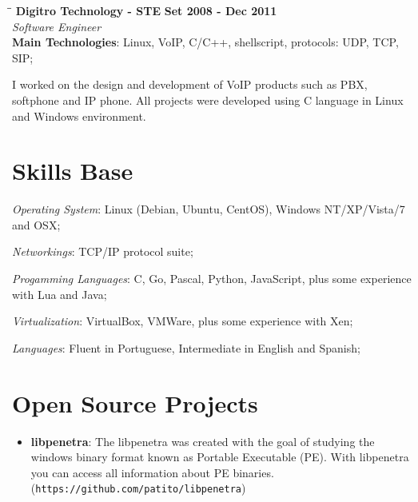 \documentclass[margin]{res}
\begin{document}
\begin{resume}
   \begin{tabbing}
   \hspace{2.3in}\= \hspace{1.5in}\= \kill %
    \textbf{Digitro Technology - STE}    \>\>\textbf{Set 2008 - Dec 2011}\\
    \textit{Software Engineer}\\   
    \textbf{Main Technologies}: Linux, VoIP, C/C++, shellscript, protocols: UDP, TCP, SIP;
   \end{tabbing}\vspace{-20pt}      %
    \vspace{2mm}
    
    I worked on the design and development of VoIP products such as PBX, softphone and IP phone. 
    All projects were developed using C language in Linux and Windows environment.


\vspace{10mm}     

\section{Skills Base}  \textit{Operating System}:  Linux (Debian, Ubuntu, CentOS), Windows NT/XP/Vista/7 and OSX;

			\textit{Networkings}: TCP/IP protocol suite;
  
			\textit{Progamming Languages}: C, Go, Pascal, Python, JavaScript, plus some experience with Lua and Java;
  
			\textit{Virtualization}: VirtualBox, VMWare, plus some experience with Xen;

			\textit{Languages}: Fluent in Portuguese, Intermediate in English and Spanish;

\section{Open Source Projects}
		\begin{itemize}
		    \vspace{2mm}
		    \item \textbf{libpenetra}: The libpenetra was created with the goal of studying the windows binary format 
		                               known as Portable Executable (PE). With libpenetra you can access all information
		                               about PE binaries. (\texttt{https://github.com/patito/libpenetra}) \vspace{1mm}
		                               

\end{itemize}
\end{resume}
\end{document}
